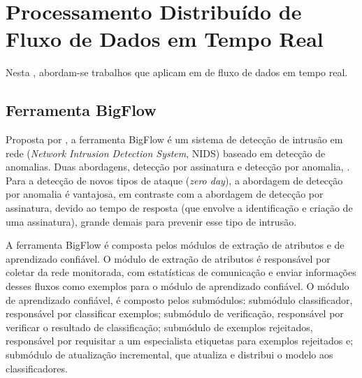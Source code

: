




\clearpage

\section{Processamento Distribuído de Fluxo de Dados em Tempo Real}

Nesta \Section, abordam-se trabalhos que aplicam  em  de fluxo de dados em tempo
real.

\subsection{Ferramenta BigFlow}

Proposta por , a ferramenta BigFlow é um sistema de
detecção de intrusão em rede (\emph{Network Intrusion Detection System}, NIDS)
baseado em detecção de anomalias.
Duas abordagens, detecção por assinatura e detecção por anomalia, 
.
Para a detecção de novos tipos de ataque (\emph{zero day}), a abordagem de
detecção por anomalia é vantajosa, em contraste com a abordagem de detecção por
assinatura, devido ao tempo de resposta (que envolve a identificação e criação de
uma assinatura), grande demais para prevenir esse tipo de intrusão.

A ferramenta BigFlow é composta pelos módulos de extração de atributos e de aprendizado confiável.
O módulo de extração de atributos
é responsável por coletar  da rede monitorada,
com estatísticas de comunicação e enviar informações desses fluxos como
exemplos para o módulo de aprendizado confiável.
O módulo de aprendizado confiável,
é composto pelos submódulos:
submódulo classificador, responsável por classificar exemplos;
submódulo de verificação, responsável por verificar o resultado de classificação;
submódulo de exemplos rejeitados, responsável por requisitar a um especialista
etiquetas para exemplos rejeitados e;
submódulo de atualização incremental, que atualiza e distribui o modelo aos classificadores.

